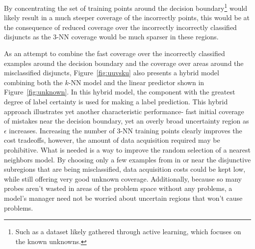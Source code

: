 By concentrating the set of training points around the decision boundary\footnote{Such as a dataset likely gathered through active learning, which focuses on the known unknowns.} would likely result in a much steeper coverage of the incorrectly points, this would be at the consequence of reduced coverage over the incorrectly incorrectly classified disjuncts as the $3$-NN coverage would be much sparser in these regions.  

As an attempt to combine the fast coverage over the incorrectly classified examples around the decision boundary and the coverage over areas around the misclassified disjuncts, Figure~\ref{fig:uuvsku} also presents a hybrid model combining both the $k$-NN model and the linear predictor shown in Figure~\ref{fig:unknown}.  In this hybrid model, the component with the greatest degree of label certainty is used for making a label prediction. This hybrid approach illustrates yet another characteristic performance- fast initial coverage of mistakes near the decision boundary, yet an overly broad uncertainty region as $\epsilon$ increases. Increasing the number of $3$-NN training points clearly improves the cost tradeoffs, however, the amount of data acquisition required may be prohibitive. What is needed is a way to improve the random selection of a nearest neighbors model. By choosing only a few examples from in or near the disjunctive subregions that are being misclassified, data acquisition costs could be kept low, while still offering very good unknown coverage. Additionally, because so many probes aren't wasted in areas of the problem space without any problems, a model's manager need not be worried about uncertain regions that won't cause problems. 

